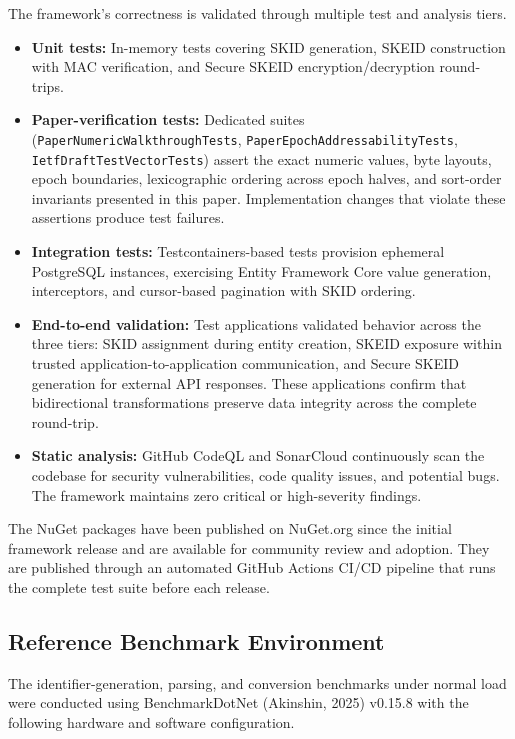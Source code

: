 \documentclass[fleqn,10pt]{wlpeerj}
\providecommand{\tightlist}{%
  \setlength{\itemsep}{0pt}\setlength{\parskip}{0pt}}
\begin{document}
The framework's correctness is validated through multiple test and
analysis tiers.

\begin{itemize}
\tightlist
\item
  \textbf{Unit tests:} In-memory tests covering SKID generation, SKEID
  construction with MAC verification, and Secure SKEID
  encryption/decryption round-trips.
\item
  \textbf{Paper-verification tests:} Dedicated suites
  (\texttt{PaperNumericWalkthroughTests},
  \texttt{PaperEpochAddressabilityTests},
  \texttt{IetfDraftTestVectorTests}) assert the exact numeric values,
  byte layouts, epoch boundaries, lexicographic ordering across epoch
  halves, and sort-order invariants presented in this paper.
  Implementation changes that violate these assertions produce test
  failures.
\item
  \textbf{Integration tests:} Testcontainers-based tests provision
  ephemeral PostgreSQL instances, exercising Entity Framework Core value
  generation, interceptors, and cursor-based pagination with SKID
  ordering.
\item
  \textbf{End-to-end validation:} Test applications validated behavior
  across the three tiers: SKID assignment during entity creation, SKEID
  exposure within trusted application-to-application communication, and
  Secure SKEID generation for external API responses. These applications
  confirm that bidirectional transformations preserve data integrity
  across the complete round-trip.
\item
  \textbf{Static analysis:} GitHub CodeQL and SonarCloud continuously
  scan the codebase for security vulnerabilities, code quality issues,
  and potential bugs. The framework maintains zero critical or
  high-severity findings.
\end{itemize}

The NuGet packages have been published on NuGet.org since the initial
framework release and are available for community review and adoption.
They are published through an automated GitHub Actions CI/CD pipeline
that runs the complete test suite before each release.

\subsection{Reference Benchmark
Environment}\label{reference-benchmark-environment}

The identifier-generation, parsing, and conversion benchmarks under
normal load were conducted using BenchmarkDotNet (Akinshin, 2025)
v0.15.8 with the following hardware and software configuration.
\end{document}
